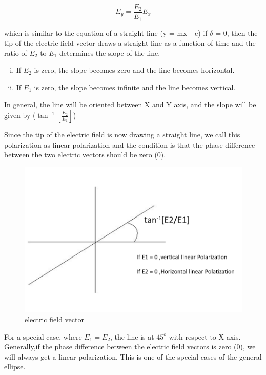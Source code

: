 \begin{equation}
E_y = \frac{E_2}{E_1}E_x
\end{equation}

which is similar to the equation of a straight line (y = mx +c)
if $\delta$ = 0, then the tip of the electric field vector draws a straight line as a function of time and the ratio of $ E_2 $ to $ E_1 $ determines the slope of the line.
\begin{enumerate}[(i)]
\item If $ E_2 $ is zero, the slope becomes zero and the line becomes horizontal.
\item If $ E_1 $ is zero, the slope becomes infinite and the line becomes vertical.
\end{enumerate} 
In general, the line will be oriented between X and Y axis, and the slope will be given by ($ \tan^{-1}[\frac{E_2}{E_1}]$)

Since the tip of the electric field is now drawing a straight line, we call this polarization as linear polarization and the condition is that the phase difference between the two electric vectors should be zero (0).
\begin{figure}[h]
\centering
\includegraphics[width=.8\linewidth]{./graphics/electric2}
\caption{electric field vector}
\end{figure}

For a special case, where $  E_1=E_2 $, the line is at $ 45^{o}$ with respect to X axis.
Generally,if the phase difference between the electric field vectors is zero (0), we will always get a linear polarization. This is one of the special cases of the general ellipse.

